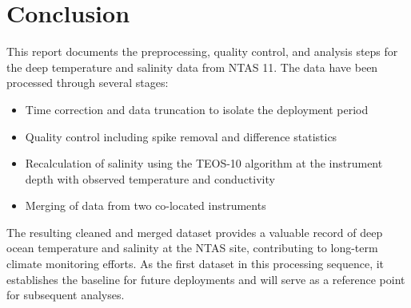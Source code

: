 \documentclass[11pt]{article}
\newcommand{\projectname}{NTAS}  %
\newcommand{\casenumber}{11}  %
\begin{document}
\section{Conclusion}
This report documents the preprocessing, quality control, and analysis steps 
for the deep temperature and salinity data from \projectname{} \casenumber{}. 
The data have been processed through several stages:

\begin{itemize}
    \item Time correction and data truncation to isolate the deployment period
    \item Quality control including spike removal and difference statistics
    \item Recalculation of salinity using the TEOS-10 algorithm at the instrument depth with observed temperature and conductivity
    \item Merging of data from two co-located instruments
\end{itemize}

The resulting cleaned and merged dataset provides a valuable record of deep ocean temperature and salinity 
at the \projectname{} site, contributing to long-term climate monitoring efforts. As the first dataset in this 
processing sequence, it establishes the baseline for future deployments and will serve as a reference point for 
subsequent analyses.
\end{document}
